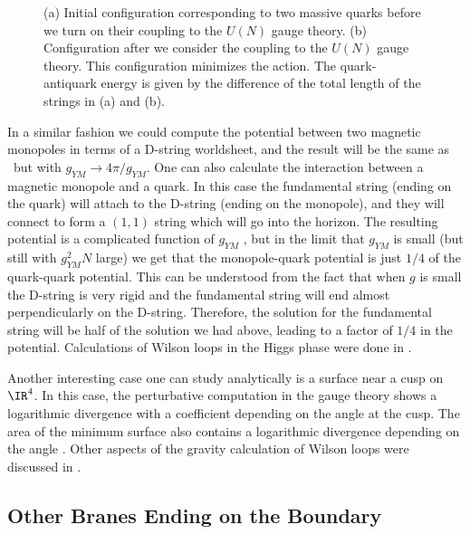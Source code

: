 \begin{figure}[htb]
\begin{center}
\epsfxsize=4.0in\leavevmode{}
\end{center}
\caption{ (a) Initial  configuration corresponding to two massive quarks
before we turn on their coupling to the $U(N)$ gauge theory.
(b) Configuration after we consider the 
coupling to the $U(N)$ gauge theory.
This configuration minimizes the action. The quark-antiquark energy
is given by the difference 
of the total length of the strings in (a) and (b).
}
\label{wi1}
\end{figure} 


In a similar fashion we could compute the potential between two
magnetic monopoles in terms of a D-string worldsheet, 
and the result will be the
same as \energy\ but with $ g_{YM} \to 4\pi/g_{YM}$.  One can also
calculate the interaction between a magnetic monopole and a quark. In
this case the fundamental string (ending on the quark) will attach to
the D-string (ending on the monopole), and they will connect to form a
$(1,1)$ string which will go into the horizon. The resulting potential
is a complicated function of $g_{YM}$
\cite{Minahan:1998xb}, but in the limit that $g_{YM}$ is small (but
still with $g_{YM}^2 N$ large) we get that the monopole-quark
potential is just $ 1/4$ of the quark-quark potential. This can be
understood from the fact that when $g$ is small the D-string is very
rigid and the fundamental string will end almost perpendicularly on
the D-string. Therefore, the solution for the fundamental string will
be half of the solution we had above, leading to a factor of $1/4$ in the
potential. Calculations of Wilson loops in the Higgs phase were done
in \cite{Minahan:1998xq}. 


Another interesting case one can study analytically is a surface 
near a cusp on $\IR^4$. In this case, the perturbative computation
in the gauge theory shows a logarithmic divergence with a coefficient
depending on the angle at the cusp. The area of the minimum surface
also contains a logarithmic divergence depending on 
the angle \cite{Drukker:1999zq}.  Other aspects of the gravity 
calculation of Wilson loops were discussed in
 \cite{Kogan:1998ti,Kogan:1999rw,Nojiri:1999gf,Zarembo:1999bu,%
Alvarez:1998dx}.

\subsection{Other Branes Ending on the Boundary}

